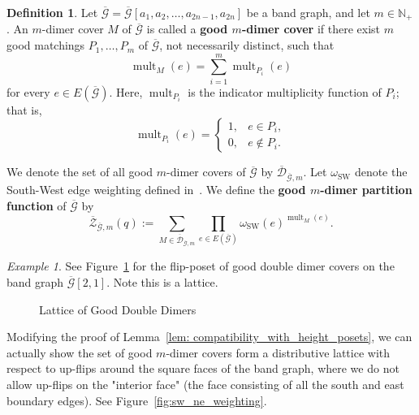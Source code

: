 \documentclass[11pt]{amsart}
\theoremstyle{definition}
\newtheorem{defn}[thm]{Definition}
\theoremstyle{remark}
\newtheorem{exmp}[thm]{Example}
\numberwithin{equation}{section}
\begin{document}
\begin{defn}
Let \(\overline{\mathcal{G}}=\overline{\mathcal{G}}[a_1,a_2,\ldots,a_{2n-1},a_{2n}]\) be a band graph, and let $m\in\mathbb{N}_+$. An $m$-dimer cover
$M$ of $\overline{\mathcal{G}}$ is called a
\textbf{good $m$-dimer cover} if there exist $m$ good matchings $P_1,\ldots,P_m$ of $\overline{\mathcal{G}}$, not necessarily distinct, such that
\[
    \operatorname{mult}_M(e)
    =
    \sum_{i=1}^{m}\operatorname{mult}_{P_i}(e)
\]
for every $e\in E(\overline{\mathcal{G}})$. Here,
$\operatorname{mult}_{P_i}$ is the indicator multiplicity function
of $P_i$; that is,
\[
    \operatorname{mult}_{P_i}(e)
    =
    \begin{cases}
        1, & e\in P_i,\\
        0, & e\notin P_i.
    \end{cases}
\]

We denote the set of all good $m$-dimer covers of
$\overline{\mathcal{G}}$ by \(\overline{\mathcal{D}}_{\overline{\mathcal{G}},m}.\) Let $\omega_{\mathrm{SW}}$ denote the South-West edge weighting
defined in~. We define the
\textbf{good $m$-dimer partition function} of
$\overline{\mathcal{G}}$ by
\[
    \overline{\mathcal{Z}}_{\overline{\mathcal{G}},m}(q)
    :=
    \sum_{
        M\in
        \overline{\mathcal{D}}_{\overline{\mathcal{G}},m}
    }
    \prod_{e\in E(\overline{\mathcal{G}})}
    \omega_{\mathrm{SW}}(e)^{
        \operatorname{mult}_M(e)
    }.
\]
\end{defn}

\begin{exmp}
    See Figure~\ref{fig:double_dimer_poset_ex} for the flip-poset of good double dimer covers on the band graph $\overline{\mathcal{G}}[2,1]$. Note this is a lattice. 

    \begin{figure}[h!]
    \centering
    
    \caption{Lattice of Good Double Dimers}
    \label{fig:double_dimer_poset_ex}
    \end{figure} 
\end{exmp}

Modifying the proof of Lemma~\ref{lem: compatibility_with_height_posets}, we can actually show the set of good $m$-dimer covers form a distributive lattice with respect to up-flips around the square faces of the band graph, where we do not allow up-flips on the "interior face" (the face consisting of all the south and east boundary edges). See Figure~\ref{fig:sw_ne_weighting}.
\end{document}
